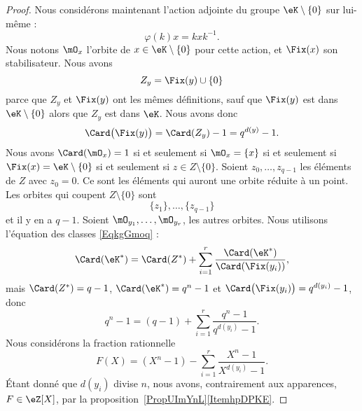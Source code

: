 \begin{proof}
	Nous considérons maintenant l'action adjointe du groupe \( \eK\setminus\{ 0 \}\) sur lui-même :
	\begin{equation}
		\varphi(k)x=kxk^{-1}.
	\end{equation}
	Nous notons \( \mO_x\) l'orbite de \( x\in \eK\setminus\{ 0 \}\) pour cette action, et \( \Fix(x)\) son stabilisateur. Nous avons
	\begin{equation}
		Z_y=\Fix(y)\cup\{ 0 \}
	\end{equation}
	parce que \( Z_y\) et \( \Fix(y)\) ont les mêmes définitions, sauf que \( \Fix(y)\) est dans \( \eK\setminus\{ 0 \}\) alors que \( Z_y\) est dans \( \eK\). Nous avons donc
	\begin{equation}
		\Card\big( \Fix(y) \big)=\Card(Z_y)-1=q^{d(y)}-1.
	\end{equation}
	Nous avons \( \Card(\mO_x)=1\) si et seulement si \( \mO_x=\{ x \}\) si et seulement si \( \Fix(x)=\eK\setminus\{ 0 \}\) si et seulement si \( z\in Z\setminus\{ 0 \}\). Soient \( z_0,\ldots, z_{q-1}\) les éléments de \( Z\) avec \( z_0=0\). Ce sont les éléments qui auront une orbite réduite à un point. Les orbites qui coupent \( Z\setminus\{ 0 \}\) sont
	\begin{equation}
		\{ z_1 \},\ldots, \{ z_{q-1} \}
	\end{equation}
	et il y en a \( q-1\). Soient \( \mO_{y_1},\ldots, \mO_{y_r}\), les autres orbites. Nous utilisons l'équation des classes \eqref{EqkgGmoq} :
	\begin{equation}
		\Card(\eK^*)=\Card(Z^*)+\sum_{i=1}^{r}\frac{ \Card(\eK^*) }{ \Card(\Fix(y_i)) },
	\end{equation}
	mais \( \Card(Z^*)=q-1\), \( \Card(\eK^*)=q^n-1\) et \( \Card\big( \Fix(y_i) \big)=q^{d(y_i)}-1\), donc
	\begin{equation}        \label{EqBPBDzE}
		q^n-1=(q-1)+\sum_{i=1}^{r}\frac{ q^n-1 }{ q^{d(y_i)}-1 }.
	\end{equation}
	Nous considérons la fraction rationnelle
	\begin{equation}        \label{EqATGciu}
		F(X)=(X^n-1)-\sum_{i=1}^{r}\frac{ X^n-1 }{ X^{d(y_i)}-1 }.
	\end{equation}
	Étant donné que \( d(y_i)\) divise \( n\), nous avons, contrairement aux apparences, \( F\in \eZ[X]\), par la proposition~\ref{PropUImYnL}\ref{ItemhpDPKE}.


\end{proof}
